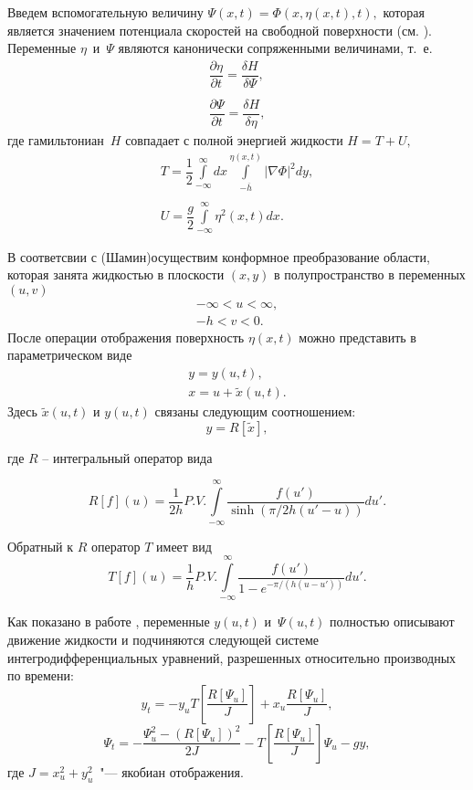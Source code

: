 Введем вспомогательную величину $\Psi(x,t)=\Phi(x,\eta(x,t),t),$ которая
является значением потенциала скоростей на свободной поверхности (см.
\cite{DiachZK1996}). Переменные $\eta$~и~$\Psi$ являются канонически сопряженными величинами, т.~е.
\begin{gather*}
\dfrac{\partial\eta}{\partial t}=\dfrac{\delta H}{\delta\Psi},
\\
\\
\dfrac{\partial\Psi}{\partial t}=\dfrac{\delta H}{\delta\eta},
\end{gather*}
где гамильтониан~$H$  совпадает с полной энергией жидкости
$H=T+U,$
\begin{gather*}
T=\dfrac{1}{2}\int\limits_{-\infty}^{\infty}dx\int\limits_{-\overline
h}^{\eta(x,t)} |\nabla\Phi|^2dy,
\\
\\
U=\dfrac{g}{2}\int\limits_{-\infty}^{\infty}\eta^2(x,t)dx.
\end{gather*}

В соответсвии с \cite{DiachZK1996} (Шамин)осуществим конформное преобразование области, которая занята жидкостью в плоскости $(x,y)$ в полупространство в
переменных $(u,v)$
\begin{gather*}
-\infty<u<\infty,\\
-h<v<0.
\end{gather*}
После операции отображения поверхность $\eta(x,t)$ можно представить в параметрическом виде
\begin{gather*}
y=y(u,t),\\
x=u+\tilde x(u,t).
\end{gather*}
Здесь $\tilde x(u,t)$ и $y(u,t)$ связаны следующим соотношением:
$$
y=R[\tilde x],
$$

где $R$ -- интегральный оператор вида

$$
R[f](u)=\dfrac{1}{2h}P.V.\int\limits_{-\infty}^{\infty}\dfrac{f(u')}{\sinh(\pi/2h(u'-u))}du'.
$$

Обратный к $R$ оператор $T$ имеет вид
$$
T[f](u)=\dfrac{1}{h}P.V.\int\limits_{-\infty}^{\infty}\dfrac{f(u')}{1-e^{-\pi/(h(u-u'))}}du'.
$$

Как показано в работе \cite{DiachZK1996}, переменные $y(u,t)$
и~$\Psi(u,t)$ полностью описывают движение жидкости и подчиняются
следующей системе интегродифференциальных уравнений, разрешенных
относительно производных по времени:
\begin{equation}\label{eq_z1}
y_t=-y_u
T\left[\dfrac{R[\Psi_u]}{J}\right]+x_u\dfrac{R[\Psi_u]}{J},
\end{equation}
\begin{equation}\label{eq_z2}
\Psi_t=-\dfrac{\Psi_u^2 - (R[\Psi_u])^2}{2J}
-T\left[\dfrac{R[\Psi_u]}{J}\right]\Psi_u - gy,
\end{equation}
где $J=x_u^2+y_u^2$~"--- якобиан отображения.

